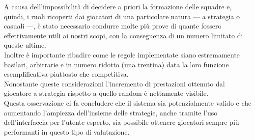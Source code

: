 A causa dell'impossibilità di decidere a priori la formazione delle squadre e, quindi, i ruoli ricoperti dai giocatori di una particolare natura --- a strategia o casuali ---, è stato necessario condurre molte più prove di quante fossero effettivamente utili ai nostri scopi, con la conseguenza di un numero limitato di queste ultime. \\
Inoltre è importante ribadire come le regole implementate siano estremamente basilari, arbitrarie e in numero ridotto (una trentina) data la loro funzione esemplificativa piuttosto che competitiva.\\
Nonostante queste considerazioni l'incremento di prestazioni ottenuto dal giocatore a strategia rispetto a quello random è nettamente visibile. \\
Questa osservazione ci fa concludere che il sistema sia potenzialmente valido e che aumentando l'ampiezza dell'insieme delle strategie, anche tramite l'uso dell'interfaccia per l'utente esperto, sia possibile ottenere giocatori sempre più performanti in questo tipo di valutazione.
